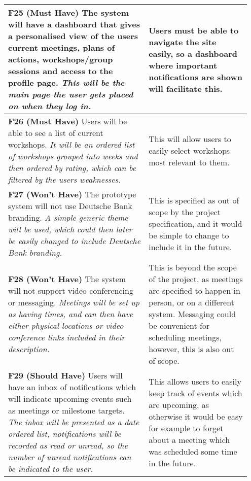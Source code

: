 \documentclass[10pt]{article}
\begin{document}
\begin{longtable}{|p{0.55\linewidth}|p{0.4\linewidth}|}
    \textbf{F25 (Must Have) }
    The system will have a dashboard that gives a personalised view of the users
    current meetings, plans of actions, workshops/group sessions and access to
    the profile page.
    \textit{This will be the main page the user gets placed on when they log in.}
        &
    Users must be able to navigate the site easily, so a dashboard where
    important notifications are shown will facilitate this.
    \\ \hline

    \textbf{F26 (Must Have) }
    Users will be able to see a list of current workshops.
    \textit{It will be an ordered list of workshops grouped into weeks and then
    ordered by rating, which can be filtered by the users weaknesses.}
    &
    This will allow users to easily select workshops most relevant to them.
    \\ \hline

    \textbf{F27 (Won't Have) }
    The prototype system will not use Deutsche Bank branding.
    \textit{A simple generic theme will be used, which could then later be
    easily changed to include Deutsche Bank branding.}
    &
    This is specified as out of scope by the project specification, and it would
    be simple to change to include it in the future.
    \\ \hline

    \textbf{F28 (Won't Have) }
    The system will not support video conferencing or messaging.
    \textit{Meetings will be set up as having times, and can then have either
    physical locations or video conference links included in their description.}
    &
    This is beyond the scope of the project, as meetings are specified to happen
    in person, or on a different system. Messaging could be convenient for
    scheduling meetings, however, this is also out of scope.
    \\ \hline

    \textbf{F29 (Should Have) }
    Users will have an inbox of notifications which will indicate upcoming
    events such as meetings or milestone targets.
    \textit{The inbox will be presented as a date ordered list, notifications
    will be recorded as read or unread, so the number of unread notifications
    can be indicated to the user.}
    &
    This allows users to easily keep track of events which are upcoming, as
    otherwise it would be easy for example to forget about a meeting which
    was scheduled some time in the future.
    \\ \hline

\end{longtable}
\end{document}
